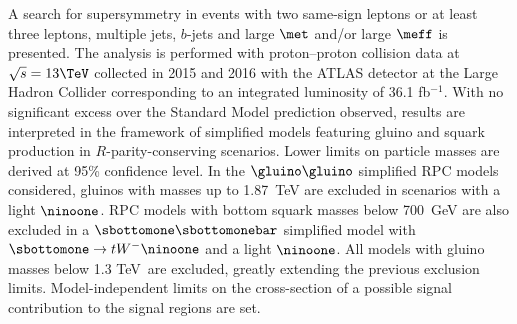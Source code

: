 A search for supersymmetry in events with two same-sign leptons or at least three leptons, multiple jets, 
$b$-jets and large $\met$ and/or large $\meff$ is presented. 
The analysis is performed with proton--proton collision data at $\sqrt{s}=13 \TeV$ 
collected in 2015 and 2016 with the ATLAS detector at the Large Hadron Collider 
corresponding to an integrated luminosity of 36.1 fb$^{-1}$. 
With no significant excess over the Standard Model prediction observed,
results are interpreted in the framework of simplified models featuring gluino 
and squark production in $R$-parity-conserving scenarios. Lower limits on particle 
masses are derived at 95\% confidence level. 
In the $\gluino\gluino$ simplified RPC models considered, gluinos with masses up to 1.87~TeV
are excluded in scenarios with a light $\ninoone$. RPC models with bottom squark masses below 700~GeV
are also excluded in a $\sbottomone\sbottomonebar$ simplified model with $\sbottomone\to tW^-\ninoone$ and a light $\ninoone$. 
All models with gluino masses below 1.3 TeV~are excluded, greatly extending the previous exclusion limits.
Model-independent limits on the cross-section of a possible signal contribution to the signal regions are set.
